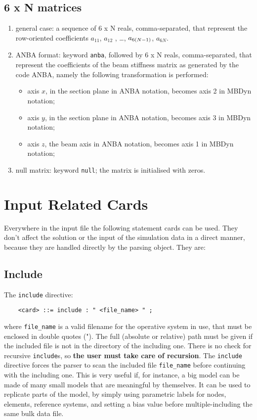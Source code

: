 \subsection{6 x N matrices}
\begin{enumerate}
    \item general case: a sequence of 6 x N reals, comma-separated, that
    represent the row-oriented coefficients $ a_{11} $, $ a_{12}$ ,
    \ldots, $ a_{6\left( N-1 \right)} $, $ a_{6N} $.
    \item ANBA format: keyword \texttt{anba}, followed by 6 x N reals,
    comma-separated, that represent the coefficients of the beam stiffness
    matrix as generated by the code ANBA, namely the following
    transformation is performed:
    \begin{itemize}
        \item axis $ x $, in the section plane in ANBA notation, 
	becomes axis 2 in MBDyn notation;    
	\item axis $ y $, in the section plane in ANBA notation, 
	becomes axis 3 in MBDyn notation;    
	\item axis $ z $, the beam axis in ANBA notation, 
	becomes axis 1 in MBDyn notation;    
    \end{itemize}
    \item null matrix: keyword \texttt{null}; the matrix is initialised 
    with zeros.
\end{enumerate}


\section{Input Related Cards} 
Everywhere in the input file the following statement cards can be used.
They don't affect the solution or the input of the simulation data in a
direct manner, because they are handled directly by the parsing object.
They are:

\subsection{Include}
The \texttt{include} directive:
\begin{verbatim}
    <card> ::= include : " <file_name> " ;
\end{verbatim}
where \texttt{file\_name} is a valid filename for the operative system in
use, that must be enclosed in double quotes (").
The full (absolute or relative) path must be given if the included file 
is not in the directory of the including one.
There is no check for recursive \texttt{include}s, so 
{\bf the user must take care of recursion}.
The \texttt{include} directive forces the parser to scan the included file
\texttt{file\_name} before continuing with the including one.
This is very useful if, for instance, a big model can be made of many
small models that are meaningful by themselves. It can be used to
replicate parts of the model, by simply using parametric labels for
nodes, elements, reference systems, and setting a bias value before 
multiple-including the same bulk data file.

